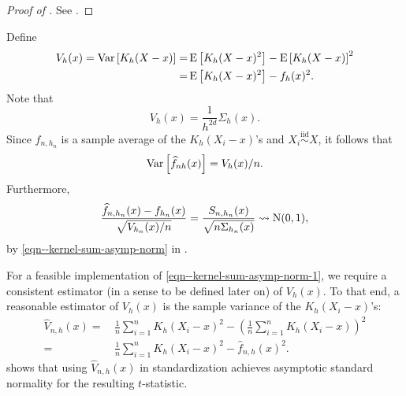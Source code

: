 \begin{proof}[Proof of ]
See .
\end{proof}

Define
\begin{equation*}
  \begin{split}
    V_{h} (x) = \mathrm{Var} \left[ K_{h} (X - x) \right] =
    & \, \mathrm{E} \left[ K_{h} (X - x)^{2} \right] - \mathrm{E} \left[ K_{h} (X - x)
    \right]^{2} \\
    =
    & \, \mathrm{E} \left[ K_{h} (X - x)^{2} \right] - f_{h} (x)^{2}.
  \end{split}
\end{equation*}
Note that
\begin{equation*}
  V_{h} (x) = \frac{1}{h^{2 d}} \Sigma_{h} (x).
\end{equation*}
Since \(\widehat{f}_{n, h_{n}}\) is a sample average of the \(K_{h} \left( X_{i}
- x \right)\)'s and \(X_{i} \overset{\mathrm{iid}}{\sim} X\), it follows that
\begin{equation*}
  \mathrm{Var} \left[ \widehat{f}_{n h} (x) \right] = V_{h} (x) / n.
\end{equation*}
Furthermore,
\begin{equation}
  \frac{\widehat{f}_{n, h_{n}} (x) - f_{h_{n}} (x)}{\sqrt{V_{h_{n}} (x) / n}} =
  \frac{S_{n, h_{n}} (x)}{\sqrt{n \Sigma_{h_{n}} (x)}} \rightsquigarrow \mathrm{N} (0,
  1),
  \label{eqn--kernel-sum-asymp-norm-1}
\end{equation}
by \eqref{eqn--kernel-sum-asymp-norm} in
.

For a feasible implementation of \eqref{eqn--kernel-sum-asymp-norm-1},
we require a consistent estimator (in a sense to be defined later on) of \(V_{h}
(x)\).
To that end, a reasonable estimator of \(V_{h} (x)\) is the sample variance of
the \(K_{h} \left( X_{i} - x \right)\)'s:
\begin{equation}
  \begin{split}
    \widehat{V}_{n, h} (x) =
    & \, \frac{1}{n} \sum_{i = 1}^{n} K_{h} \left( X_{i} - x \right)^{2} -
    \left( \frac{1}{n} \sum_{i = 1}^{n} K_{h} \left( X_{i} - x \right)
    \right)^{2} \\
    =
    & \, \frac{1}{n} \sum_{i = 1}^{n} K_{h} \left( X_{i} - x \right)^{2} -
    \widehat{f}_{n, h} (x)^{2}.
  \end{split}
\end{equation}
 shows that using \(\widehat{V}_{n, h}
(x)\) in standardization achieves asymptotic standard normality for the
resulting \(t\)-statistic.

